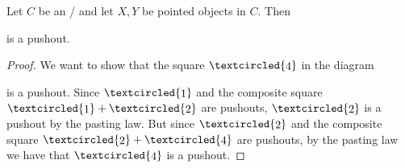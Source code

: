 \begin{lemma}\label{lem:poOfCollapseMapsIsTrivial}
    Let $C$ be an \inftytop/ and let $X,Y$ be pointed objects in $C$. 
    Then 
    \begin{center}
    \end{center}
    is a pushout.
    \begin{proof}
        We want to show that the square $\textcircled{\raisebox{-0.9pt}{4}}$ in the diagram
        \begin{center}
        \end{center}
        is a pushout.
        Since $\textcircled{\raisebox{-0.9pt}{1}}$ and the composite square $\textcircled{\raisebox{-0.9pt}{1}}+\textcircled{\raisebox{-0.9pt}{2}}$ are pushouts, $\textcircled{\raisebox{-0.9pt}{2}}$ is a pushout by the pasting law.
        But since $\textcircled{\raisebox{-0.9pt}{2}}$ and the composite square $\textcircled{\raisebox{-0.9pt}{2}}+\textcircled{\raisebox{-0.9pt}{4}}$ are pushouts, by the pasting law we have that $\textcircled{\raisebox{-0.9pt}{4}}$ is a pushout.
    \end{proof}
\end{lemma}
